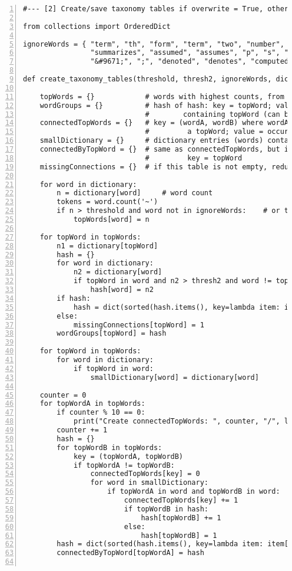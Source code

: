 \documentclass[oneside,10pt]{book}
\begin{document}
\begin{lstlisting}[numbers=left]
#--- [2] Create/save taxonomy tables if overwrite = True, otherwise read them

from collections import OrderedDict

ignoreWords = { "term", "th", "form", "term", "two", "number", "meaning", "normally", 
                "summarizes", "assumed", "assumes", "p", "s", "et", "possible", 
                "&#9671;", ";", "denoted", "denotes", "computed", "other"}

def create_taxonomy_tables(threshold, thresh2, ignoreWords, dictionary): 

    topWords = {}            # words with highest counts, from dictionary
    wordGroups = {}          # hash of hash: key = topWord; value = hash of words 
                             #        containing topWord (can be empty)
    connectedTopWords = {}   # key = (wordA, wordB) where wordA and wordB contains 
                             #         a topWord; value = occurrences count
    smallDictionary = {}     # dictionary entries (words) containing a topWord
    connectedByTopWord = {}  # same as connectedTopWords, but in flattened hash format; 
                             #         key = topWord
    missingConnections = {}  # if this table is not empty, reduce threshold and/or thresh2

    for word in dictionary:
        n = dictionary[word]     # word count 
        tokens = word.count('~')
        if n > threshold and word not in ignoreWords:    # or tokens > 1 and n > 1: 
            topWords[word] = n  

    for topWord in topWords:
        n1 = dictionary[topWord] 
        hash = {}
        for word in dictionary:
            n2 = dictionary[word]
            if topWord in word and n2 > thresh2 and word != topWord: 
                hash[word] = n2
        if hash:
            hash = dict(sorted(hash.items(), key=lambda item: item[1], reverse=True))
        else: 
            missingConnections[topWord] = 1
        wordGroups[topWord] = hash  

    for topWord in topWords:
        for word in dictionary:
            if topWord in word:
                smallDictionary[word] = dictionary[word]

    counter = 0    
    for topWordA in topWords:
        if counter % 10 == 0:
            print("Create connectedTopWords: ", counter, "/", len(topWords))
        counter += 1
        hash = {}
        for topWordB in topWords:
            key = (topWordA, topWordB)
            if topWordA != topWordB:
                connectedTopWords[key] = 0
                for word in smallDictionary:
                    if topWordA in word and topWordB in word:
                        connectedTopWords[key] += 1
                        if topWordB in hash:
                            hash[topWordB] += 1
                        else:
                            hash[topWordB] = 1
        hash = dict(sorted(hash.items(), key=lambda item: item[1], reverse=True))
        connectedByTopWord[topWordA] = hash


\end{lstlisting}
\end{document}
